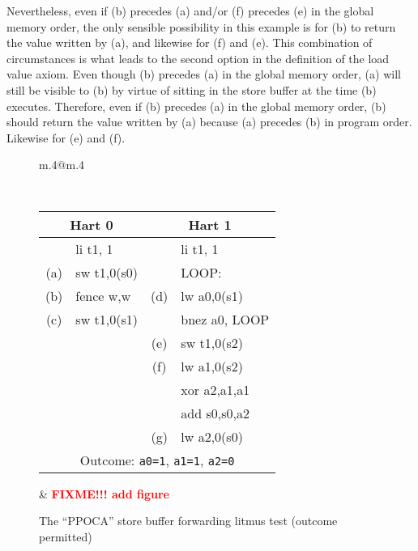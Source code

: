 Nevertheless, even if (b) precedes (a) and/or (f) precedes (e) in the global memory order, the only sensible possibility in this example is for (b) to return the value written by (a), and likewise for (f) and (e).  This combination of circumstances is what leads to the second option in the definition of the load value axiom.
Even though (b) precedes (a) in the global memory order, (a) will still be visible to (b) by virtue of sitting in the store buffer at the time (b) executes.
Therefore, even if (b) precedes (a) in the global memory order, (b) should return the value written by (a) because (a) precedes (b) in program order.
Likewise for (e) and (f).

\begin{figure}[h!]
  \centering
  \begin{tabular}{m{.4\linewidth}@{\qquad}m{.4\linewidth}}
  {
    \tt\small
    \begin{tabular}{cl||cl}
    \multicolumn{2}{c}{Hart 0} & \multicolumn{2}{c}{Hart 1} \\
    \hline
          & li t1, 1    &     & li t1, 1      \\
      (a) & sw t1,0(s0) &     & LOOP:         \\
      (b) & fence w,w   & (d) & lw a0,0(s1)   \\
      (c) & sw t1,0(s1) &     & bnez a0, LOOP \\
          &             & (e) & sw t1,0(s2)   \\
          &             & (f) & lw a1,0(s2)   \\
          &             &     & xor a2,a1,a1  \\
          &             &     & add s0,s0,a2  \\
          &             & (g) & lw a2,0(s0)   \\
      \hline
      \multicolumn{4}{c}{Outcome: {\tt a0=1}, {\tt a1=1}, {\tt a2=0}}
    \end{tabular}
  }
  &
  \textcolor{red}{\bf FIXME!!! add figure}
  \end{tabular}
  \caption{The ``PPOCA'' store buffer forwarding litmus test (outcome permitted)}
  \label{fig:litmus:ppoca}
\end{figure}

